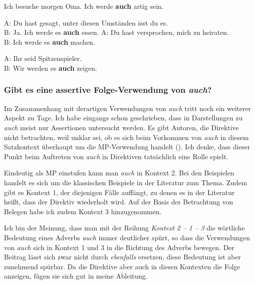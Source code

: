 {\begin{exe}
	\ex\label{1139} 
	Ich besuche morgen Oma. Ich werde \textbf{auch} artig sein.
\end{exe}

\begin{exe}
	\ex\label{1140} 
		\begin{xlist}
			\ex\label{1140a} 
				A: Du hast gesagt, unter diesen Umständen isst du es.\\
				B: Ja. Ich werde es \textbf{auch} essen.
			\ex\label{1140b} 
				A: Du hast versprochen, mich zu heiraten.\\
				B: Ich werde es \textbf{auch} machen.
		\end{xlist}
\end{exe}	

\begin{exe}
	\ex\label{1141} 
	A: Ihr seid Spitzenspieler.\\
	B: Wir werden es \textbf{auch} zeigen.
\end{exe}	
	
\subsubsection{Gibt es eine assertive Folge-Verwendung von \textit{auch}?}
Im Zusammenhang mit derartigen Verwendungen von \textit{auch} tritt noch ein weiterer Aspekt zu Tage. Ich habe eingangs schon geschrieben, dass in Darstellungen zu \textit{auch} meist nur Assertionen untersucht werden. Es gibt Autoren, die Direktive nicht betrachten, weil unklar sei, ob es sich beim Vorkommen von \textit{auch} in diesem Satzkontext überhaupt um die MP-Verwendung handelt (\citealt[222]{Karagjosova2004}). Ich denke, dass dieser Punkt beim Auftreten von \textit{auch} in Direktiven tatsächlich eine Rolle spielt.

Eindeutig als MP einstufen kann man \textit{auch} in Kontext 2. Bei den Beispielen handelt es sich um die klassischen Beispiele in der Literatur zum Thema. Zudem gibt es Kontext 1, der diejenigen Fälle auffängt, zu denen es in der Literatur heißt, dass der Direktiv wiederholt wird. Auf der Basis der Betrachtung von Belegen habe ich zudem Kontext 3 hinzugenommen.

Ich bin der Meinung, dass man mit der Reihung \textit{Kontext 2 – 1 – 3} die wörtliche Bedeutung eines Adverbs \textit{auch} immer deutlicher spürt, so dass die Verwendungen von \textit{auch} sich in Kontext 1 und 3 in die Richtung des Adverbs bewegen. Der Beitrag lässt sich zwar nicht durch \textit{ebenfalls} ersetzen, diese Bedeutung ist aber zunehmend spürbar. Da die Direktive aber auch in diesen Kontexten die Folge anzeigen, fügen sie sich gut in meine Ableitung.

}
